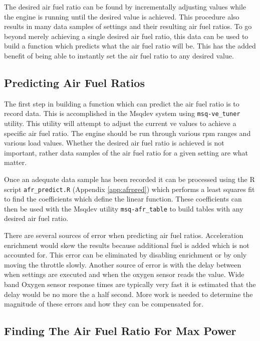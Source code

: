 \documentclass{article}
\begin{document}
The desired air fuel ratio can be found by incrementally adjusting
values while the engine is running until the desired value is achieved.
This procedure also results in many data samples of settings and their
resulting air fuel ratios.
To go beyond merely achieving a single desired air fuel ratio, this data
can be used to build a function which predicts what the air
fuel ratio will be.
This has the added benefit of being able to instantly set the air fuel ratio
to any desired value.

\subsection{Predicting Air Fuel Ratios}
\label{sec:predafr}

The first step in building a function which can predict the air fuel ratio
is to record data.
This is accomplished in the Msqdev system using \verb+msq-ve_tuner+ utility.
This utility will attempt to adjust the current ve values to achieve
a specific air fuel ratio.
The engine should be run through various rpm ranges and various load values.
Whether the desired air fuel ratio is achieved is not important,
rather data samples of the air fuel ratio for a given setting are what
matter.

Once an adequate data sample has been recorded it can be processed 
using the R script \verb+afr_predict.R+ (Appendix \ref{app:afrpred})
which performs a least squares fit to find the coefficients which define
the linear function.
These coefficients can then be used with the Msqdev utility \verb+msq-afr_table+
to build tables with any desired air fuel ratio.

There are several sources of error when predicting air fuel ratios.
Acceleration enrichment would skew the results because additional
fuel is added which is not accounted for.
This error can be eliminated by disabling enrichment or by only
moving the throttle slowly.
Another source of error is with the delay between when settings are
executed and when the oxygen sensor reads the value.
Wide band Oxygen sensor response times are typically very fast it
is estimated that the delay would be no more the a half second.
More work is needed to determine the magnitude of these errors and
how they can be compensated for.

\FloatBarrier  %

\subsection{Finding The Air Fuel Ratio For Max Power}
\label{sec:findafrpow}
\end{document}
